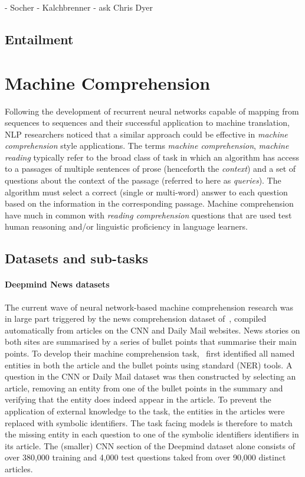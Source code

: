 \documentclass[11pt,letterpaper]{article}
\begin{document}
- Socher
- Kalchbrenner
- ask Chris Dyer


\subsection{Entailment}

\section{Machine Comprehension}

Following the development of recurrent neural networks capable of mapping from sequences to sequences and their successful application to machine translation, NLP researchers noticed that a similar approach could be effective in \emph{machine comprehension} style applications. The terms \emph{machine comprehension}, \emph{machine reading} typically refer to the broad class of task in which an algorithm has access to a passages of multiple sentences of prose (henceforth the \emph{context}) and a set of questions about the context of the passage (referred to here as \emph{queries}). The algorithm must select a correct (single or multi-word) answer to each question based on the information in the corresponding passage.  Machine comprehension have much in common with \emph{reading comprehension} questions that are used test human reasoning and/or linguistic proficiency in language learners. 

\subsection{Datasets and sub-tasks}
\paragraph{Deepmind News datasets} The current wave of neural network-based machine comprehension research was in large part triggered by the news comprehension dataset of~, compiled automatically from articles on the CNN and Daily Mail websites. News stories on both sites are summarised by a series of bullet points that summarise their main points. To develop their machine comprehension task,~\cite{hermann2015teaching} first identified all named entities in both the article and the bullet points using standard (NER) tools. A question in the CNN or Daily Mail dataset was then constructed by selecting an article, removing an entity from one of the bullet points in the summary and verifying that the entity does indeed appear in the article. To prevent the application of external knowledge to the task, the entities in the articles were replaced with symbolic identifiers. The task facing models is therefore to match the missing entity in each question to one of the symbolic identifiers identifiers in its article. The (smaller) CNN section of the Deepmind dataset alone consists of over 380,000 training and 4,000 test questions taked from over 90,000 distinct articles.
\end{document}
